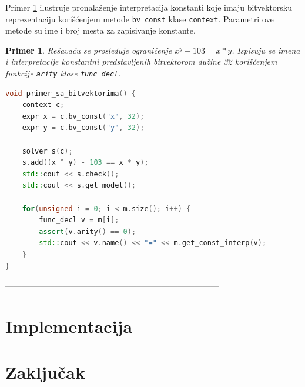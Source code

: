 \documentclass[12pt,oneside]{memoir}
\newtheorem{primer}{Primer}
\begin{document}
Primer \ref{ex6} ilustruje pronalaženje interpretacija konstanti koje imaju bitvektorsku reprezentaciju korišćenjem metode \texttt{bv\_const} klase \texttt{context}. Parametri ove metode su ime i broj mesta za zapisivanje konstante. 
\begin{primer} \label{ex6} 
Rešavaču se prosleđuje ograničenje $x^y - 103 = x*y$. 
Ispisuju se imena i interpretacije konstantni predstavljenih bitvektorom dužine 32 korišćenjem funkcije \texttt{arity} klase \texttt{func\_decl}.
\begin{lstlisting}[language=C++]
void primer_sa_bitvektorima() {
    context c;
    expr x = c.bv_const("x", 32);
    expr y = c.bv_const("y", 32);

    solver s(c);
    s.add((x ^ y) - 103 == x * y);
    std::cout << s.check();
    std::cout << s.get_model();
    
    for(unsigned i = 0; i < m.size(); i++) {
        func_decl v = m[i];
        assert(v.arity() == 0); 
        std::cout << v.name() << "=" << m.get_const_interp(v);
    }
}

\end{lstlisting}
\end{primer}



------------------------------------------------------------------------------
\chapter{Implementacija}


\chapter{Zaključak} \label{zakljucak}


\literatura

\backmatter

\end{document}
